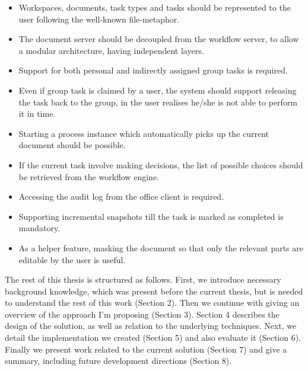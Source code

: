 \begin{itemize}
\item Workspaces, documents, task types and tasks should be represented to the
user following the well-known file-metaphor.
\item The document server should be decoupled from the workflow server, to
allow a modular architecture, having independent layers.
\item Support for both personal and indirectly assigned group tasks is required.
\item Even if group task is claimed by a user, the system should support
releasing the task back to the group, in the user realises he/she is not able to
perform it in time.
\item Starting a process instance which automatically picks up the current
document should be possible.
\item If the current task involve making decisions, the list of possible
choices should be retrieved from the workflow engine.
\item Accessing the audit log from the office client is required.
\item Supporting incremental snapshots till the task is marked as completed is
mandatory.
\item As a helper feature, masking the document so that only the relevant parts
are editable by the user is useful.
\end{itemize}

The rest of this thesis is structured as follows. First, we introduce necessary
background knowledge, which was present before the current thesis, but is
needed to understand the rest of this work (Section 2). Then we continue with
giving an overview of the approach I'm proposing (Section 3). Section 4
describes the design of the solution, as well as relation to the underlying
techniques. Next, we detail the implementation we created (Section 5) and also
evaluate it (Section 6). Finally we present work related to the current
solution (Section 7) and give a summary, including future development
directions (Section 8).
